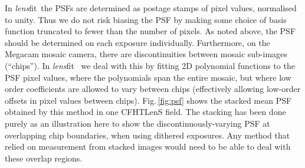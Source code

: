 \documentclass{article}
\def\lensfitsuite{{\em lens}fit\ }
\begin{document}
In \lensfitsuite the PSFs are determined as postage stamps of pixel values, normalised to unity.
Thus we do not risk biasing the PSF by making some choice of basis function truncated to
fewer than the number of pixels.
As noted above, the PSF should be determined on each exposure individually.  Furthermore, on the
Megacam mosaic camera, there are discontinuities between mosaic sub-images (``chips'').  In \lensfitsuite
we deal with this by fitting 2D polynomial functions to the PSF pixel values, where the polynomials
span the entire mosaic, but where low order coefficients are allowed to vary between chips 
(effectively allowing low-order offsets in pixel values between chips).  
Fig.\,\ref{fig:psf} shows the stacked mean PSF obtained by this method in one CFHTLenS field.
The stacking has been done purely as an illustration here to show the discontinuously-varying PSF
at overlapping chip boundaries, when using dithered exposures.  Any method that relied on measurement
from stacked images would need to be able to deal with these overlap regions.
\end{document}
